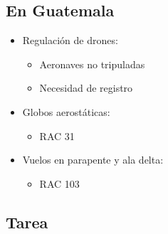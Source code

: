 \subsection{En Guatemala}
\begin{itemize}
    \item Regulación de drones:
    \begin{itemize}
        \item Aeronaves no tripuladas
        \item Necesidad de registro
    \end{itemize}
    \item Globos aerostáticas:
    \begin{itemize}
        \item RAC 31
    \end{itemize}
    \item Vuelos en parapente y ala delta:
    \begin{itemize}
        \item RAC 103
    \end{itemize}
\end{itemize}

\subsection{Tarea}
\textbf{}   
